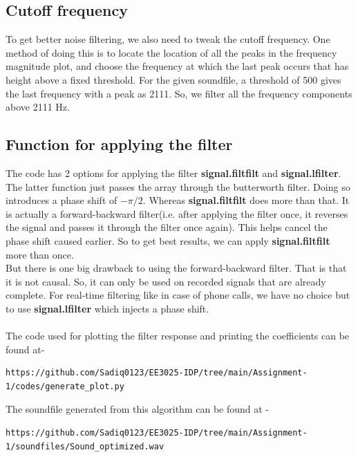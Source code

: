 \documentclass[journal,12pt,twocolumn]{IEEEtran}
\begin{document}
  \subsection{\textbf{Cutoff frequency}}
  To get better noise filtering, we also need to tweak the cutoff frequency. One method of doing this is to locate the location of all the peaks in the frequency magnitude plot, and choose the frequency at which the last peak occurs that has height above a fixed threshold. For the given soundfile, a threshold of 500 gives the last frequency with a peak as 2111. So, we filter all the frequency components above 2111 Hz.
  
  \subsection{\textbf{Function for applying the filter}}
  The code has 2 options for applying the filter \textbf{signal.filtfilt} and \textbf{signal.lfilter}. The latter function just passes the array through the butterworth filter. Doing so introduces a phase shift of $-\pi/2$. Whereas \textbf{signal.filtfilt} does more than that. It is actually a forward-backward filter(i.e. after applying the filter once, it reverses the signal and passes it through the filter once again). This helps cancel the phase shift caused earlier. So to get best results, we can apply \textbf{signal.filtfilt} more than once.
  \\
  
  But there is one big drawback to using the forward-backward filter. That is that it is not causal. So, it can only be used on recorded signals that are already complete. For real-time filtering like in case of phone calls, we have no choice but to use \textbf{signal.lfilter} which injects a phase shift.
  \\~\\
  
  The code used for plotting the filter response and printing the coefficients can be found at- 
  \begin{lstlisting}
https://github.com/Sadiq0123/EE3025-IDP/tree/main/Assignment-1/codes/generate_plot.py
  \end{lstlisting}
  
  The soundfile generated from this algorithm can be found at - 
  \begin{lstlisting}
https://github.com/Sadiq0123/EE3025-IDP/tree/main/Assignment-1/soundfiles/Sound_optimized.wav
  \end{lstlisting}
  
\end{document}
